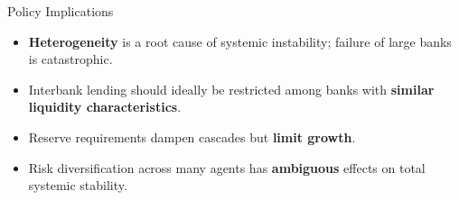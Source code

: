 \begin{frame}{Policy Implications}
  \begin{itemize}
    \item \textbf{Heterogeneity} is a root cause of systemic instability; failure of large banks is catastrophic.
    \item Interbank lending should ideally be restricted among banks with \textbf{similar liquidity characteristics}.
    \item Reserve requirements dampen cascades but \textbf{limit growth}.
    \item Risk diversification across many agents has \textbf{ambiguous} effects on total systemic stability.
  \end{itemize}
\end{frame}


